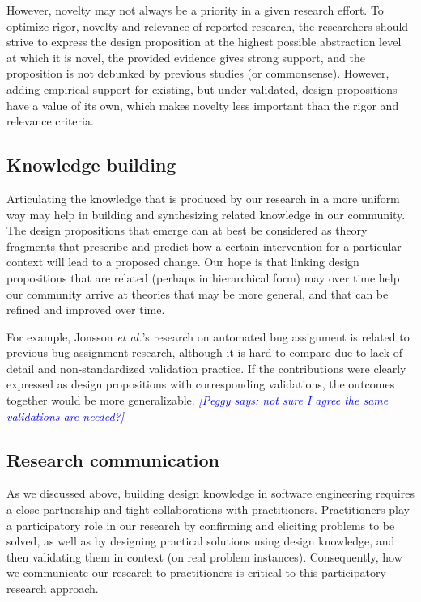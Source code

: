 \documentclass[graybox]{svmult}
\newcommand{\peggy}[1]{\textcolor{blue}{{\it [Peggy says: #1]}}}
\newcommand{\peggy}[1]{}
\begin{document}
However, novelty may not always be a priority in a given research effort.
To optimize rigor, novelty and relevance of reported research, the researchers should strive to express the design proposition at the highest possible abstraction level at which it is novel, the provided evidence gives strong support, and the proposition is not debunked by previous studies (or commonsense). However, adding empirical support for existing, but under-validated, design propositions have a value of its own, which makes novelty less important than the rigor and relevance criteria.


\subsection{Knowledge building}
\label{sec:knowledge}

Articulating the knowledge that is produced by our research in a more uniform way may help in building and synthesizing related knowledge in our community. 
The design propositions that emerge can at best be considered as theory fragments that prescribe and predict how a certain intervention for a particular context will lead to a proposed change. 
Our hope is that linking design propositions that are related (perhaps in hierarchical form) may over time help our community arrive at theories that may be more general, and that can be refined and improved over time. 

For example, Jonsson \emph{et al.}'s research on automated bug assignment is related to previous bug assignment research, although it is hard to compare due to lack of detail and non-standardized validation practice. If the contributions were clearly expressed as design propositions with corresponding validations, the outcomes together would be more generalizable. 
\peggy{not sure I agree the same validations are needed?}

\subsection{Research communication}
\label{sec:communication}

As we discussed above, building design knowledge in software engineering requires a close partnership and tight collaborations with practitioners. 
Practitioners play a participatory role in our research by confirming and eliciting problems to be solved, as well as by designing practical solutions using design knowledge, and then validating them in context (on real problem instances). 
Consequently, how we communicate our research to practitioners is critical to this participatory research approach. 
\end{document}

